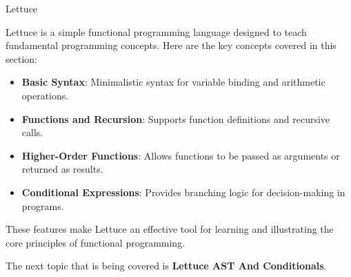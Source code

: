 \begin{notes}{Lettuce}
\begin{highlight}
        Lettuce is a simple functional programming language designed to teach fundamental programming concepts. Here are the key concepts covered in this section:
        
        \begin{itemize}
            \item \textbf{Basic Syntax}: Minimalistic syntax for variable binding and arithmetic operations.
            \item \textbf{Functions and Recursion}: Supports function definitions and recursive calls.
            \item \textbf{Higher-Order Functions}: Allows functions to be passed as arguments or returned as results.
            \item \textbf{Conditional Expressions}: Provides branching logic for decision-making in programs.
        \end{itemize}
        
        These features make Lettuce an effective tool for learning and illustrating the core principles of functional programming.
    
    \end{highlight}
\end{notes}

The next topic that is being covered is \textbf{Lettuce AST And Conditionals}.

